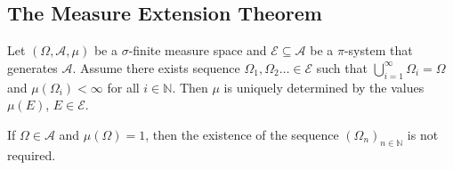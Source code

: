 \subsection{The Measure Extension Theorem}

\begin{lemma}
\label{uniquely defined by base pi sys}
    Let $(\Omega,\mathcal{A},\mu)$ be a $\sigma$-finite measure space and $\mathcal{E}\subseteq\mathcal{A}$ be a $\pi$-system that generates $\mathcal{A}$. Assume there exists sequence $\Omega_1,\Omega_2\ldots\in\mathcal{E}$ such that $\bigcup_{i=1}^\infty\Omega_i=\Omega$ and $\mu(\Omega_i)<\infty$ for all $i\in\mathbb{N}$. Then $\mu$ is uniquely determined by the values $\mu(E)$, $E\in\mathcal{E}$.
    
    If $\Omega\in\mathcal{A}$ and $\mu(\Omega)=1$, then the existence of the sequence $(\Omega_n)_{n\in\mathbb{N}}$ is not required.
\end{lemma}

